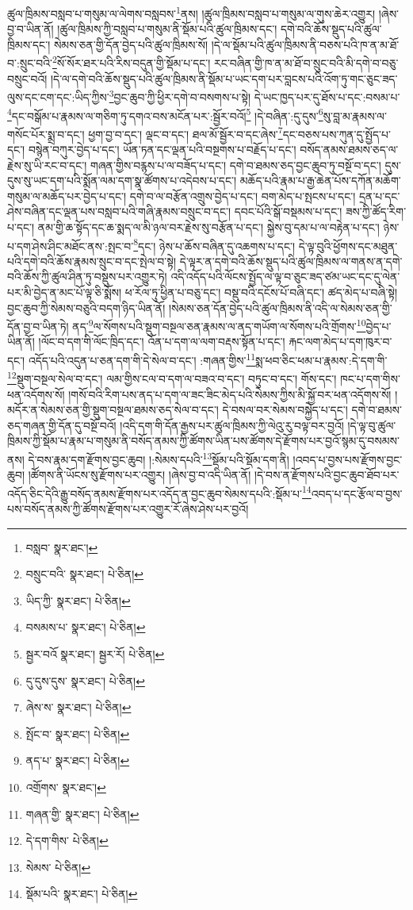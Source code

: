 ཚུལ་ཁྲིམས་བསླབ་པ་གསུམ་ལ་ལེགས་བསླབས་\footnote{བསླབ་  སྣར་ཐང་། }ནས། །ཚུལ་ཁྲིམས་བསླབ་པ་གསུམ་ལ་གུས་ཆེར་འགྱུར། །ཞེས་བྱ་བ་ཡིན་ནོ། །ཚུལ་ཁྲིམས་ཀྱི་བསླབ་པ་གསུམ་ནི་སྡོམ་པའི་ཚུལ་ཁྲིམས་དང་། དགེ་བའི་ཆོས་སྡུད་པའི་ཚུལ་ཁྲིམས་དང་། སེམས་ཅན་གྱི་དོན་བྱེད་པའི་ཚུལ་ཁྲིམས་སོ། །དེ་ལ་སྡོམ་པའི་ཚུལ་ཁྲིམས་ནི་བཅས་པའི་ཁ་ན་མ་ཐོ་བ་:སྲུང་བའི་\footnote{བསྲུང་བའི་  སྣར་ཐང་།  པེ་ཅིན། }སོ་སོར་ཐར་པའི་རིས་བདུན་གྱི་སྡོམ་པ་དང་། རང་བཞིན་གྱི་ཁ་ན་མ་ཐོ་བ་སྲུང་བའི་མི་དགེ་བ་བཅུ་བསྲུང་བའོ། །དེ་ལ་དགེ་བའི་ཆོས་སྡུད་པའི་ཚུལ་ཁྲིམས་ནི་སྡོམ་པ་ཡང་དག་པར་བླངས་པའི་འོག་ཏུ་གང་ཅུང་ཟད་ལུས་དང་ངག་དང་:ཡིད་ཀྱིས་\footnote{ཡིད་ཀྱི་  སྣར་ཐང་།  པེ་ཅིན། }བྱང་ཆུབ་ཀྱི་ཕྱིར་དགེ་བ་བསགས་པ་སྟེ། དེ་ཡང་ཁྱད་པར་དུ་ཐོས་པ་དང་:བསམ་པ་\footnote{བསམས་པ་  སྣར་ཐང་།  པེ་ཅིན། }དང་བསྒོམ་པ་རྣམས་ལ་གཅིག་ཏུ་དགའ་བས་མངོན་པར་:སྦྱོར་བའོ།\footnote{སྦྱར་བའོ  སྣར་ཐང་། སྦྱར་རོ།  པེ་ཅིན། } །དེ་བཞིན་:དུ་དུས་\footnote{དུ་དུས་དུས་  སྣར་ཐང་།  པེ་ཅིན། }སུ་བླ་མ་རྣམས་ལ་གསོང་པོར་སྨྲ་བ་དང་། ཕྱག་བྱ་བ་དང་། ལྡང་བ་དང་། ཐལ་མོ་སྦྱོར་བ་དང་ཞེས་\footnote{ཞེས་ས་  སྣར་ཐང་།  པེ་ཅིན། }དང་བཅས་པས་ཀུན་དུ་སྤྱོད་པ་དང་། བསྙེན་བཀུར་བྱེད་པ་དང་། ཡོན་ཏན་དང་ལྡན་པའི་བསྔགས་པ་བརྗོད་པ་དང་། བསོད་ནམས་ཐམས་ཅད་ལ་རྗེས་སུ་ཡི་རང་བ་དང་། གཞན་གྱིས་བརྙས་པ་ལ་བཟོད་པ་དང་། དགེ་བ་ཐམས་ཅད་བྱང་ཆུབ་ཏུ་བསྔོ་བ་དང་། དུས་དུས་སུ་ཡང་དག་པའི་སྨོན་ལམ་དག་སྣ་ཚོགས་པ་འདེབས་པ་དང་། མཆོད་པའི་རྣམ་པ་རྒྱ་ཆེན་པོས་དཀོན་མཆོག་གསུམ་ལ་མཆོད་པར་བྱེད་པ་དང་། དགེ་བ་ལ་བརྩོན་འགྲུས་བྱེད་པ་དང་། བག་མེད་པ་སྤངས་པ་དང་། དྲན་པ་དང་ཤེས་བཞིན་དང་ལྡན་པས་བསླབ་པའི་གཞི་རྣམས་བསྲུང་བ་དང་། དབང་པོའི་སྒོ་བསྡམས་པ་དང་། ཟས་ཀྱི་ཚོད་རིག་པ་དང་། ནམ་གྱི་ཆ་སྟོད་དང་ཆ་སྨད་ལ་མི་ཉལ་བར་རྗེས་སུ་བརྩོན་པ་དང་། སྐྱེས་བུ་དམ་པ་ལ་བརྟེན་པ་དང་། ཉེས་པ་དག་ཤེས་ཤིང་མཐོང་ནས་:སྤང་བ་\footnote{སྤོང་བ་  སྣར་ཐང་།  པེ་ཅིན། }དང་། ཉེས་པ་ཆོས་བཞིན་དུ་འཆགས་པ་དང་། དེ་ལྟ་བུའི་ཕྱོགས་དང་མཐུན་པའི་དགེ་བའི་ཆོས་རྣམས་སྲུང་བ་དང་སྤེལ་བ་སྟེ། དེ་ལྟར་ན་དགེ་བའི་ཆོས་སྡུད་པའི་ཚུལ་ཁྲིམས་ལ་གནས་ན་དགེ་བའི་ཆོས་ཀྱི་ཚུལ་ཤིན་ཏུ་བསྡུས་པར་འགྱུར་ཏེ། འདི་འདོད་པའི་ལོངས་སྤྱོད་ལ་ལྟ་བ་ཅུང་ཟད་ཙམ་ཡང་དང་དུ་ལེན་པར་མི་བྱེད་ན་མང་པོ་ལྟ་ཅི་སྨོས། ཕ་རོལ་ཏུ་ཕྱིན་པ་བཅུ་དང་། བསྡུ་བའི་དངོས་པོ་བཞི་དང་། ཚད་མེད་པ་བཞི་སྟེ། བྱང་ཆུབ་ཀྱི་སེམས་བཅུའི་བདག་ཉིད་ཡིན་ནོ། །སེམས་ཅན་དོན་བྱེད་པའི་ཚུལ་ཁྲིམས་ནི་འདི་ལ་སེམས་ཅན་གྱི་དོན་བྱ་བ་ཡིན་ཏེ། ནད་\footnote{ནད་པ་  སྣར་ཐང་།  པེ་ཅིན། }ལ་སོགས་པའི་སྡུག་བསྔལ་ཅན་རྣམས་ལ་ནད་གཡོག་ལ་སོགས་པའི་གྲོགས་\footnote{འགྲོགས་  སྣར་ཐང་། }བྱེད་པ་ཡིན་ནོ། །ལོང་བ་དག་གི་ལོང་ཁྲིད་དང་། འོན་པ་དག་ལ་ལག་བརྡས་སྟོན་པ་དང་། རྐང་ལག་མེད་པ་དག་ཁུར་བ་དང་། འདོད་པའི་འདུན་པ་ཅན་དག་གི་དེ་སེལ་བ་དང་། :གཞན་གྱིས་\footnote{གཞན་གྱི་  སྣར་ཐང་།  པེ་ཅིན། }སྨ་ཕབ་ཅིང་ཕམ་པ་རྣམས་:དེ་དག་གི་\footnote{དེ་དག་གིས་  པེ་ཅིན། }སྡུག་བསྔལ་སེལ་བ་དང་། ལམ་གྱིས་ངལ་བ་དག་ལ་བཟའ་བ་དང་། བཏུང་བ་དང་། གོས་དང་། ཁང་པ་དག་གིས་ཕན་འདོགས་སོ། །གསོ་བའི་རིག་པས་ནད་པ་དག་ལ་ཟང་ཟིང་མེད་པའི་སེམས་ཀྱིས་མི་སྐྱོ་བར་ཕན་འདོགས་སོ། །མདོར་ན་སེམས་ཅན་གྱི་སྡུག་བསྔལ་ཐམས་ཅད་སེལ་བ་དང་། དེ་བསལ་བར་སེམས་བསྐྱེད་པ་དང་། དགེ་བ་ཐམས་ཅད་གཞན་གྱི་དོན་དུ་བསྔོ་བའོ། །འདི་དག་གི་དོན་རྒྱས་པར་ཚུལ་ཁྲིམས་ཀྱི་ལེའུ་རུ་བལྟ་བར་བྱའོ། །དེ་ལྟ་བུ་ཚུལ་ཁྲིམས་ཀྱི་སྡོམ་པ་རྣམ་པ་གསུམ་ནི་བསོད་ནམས་ཀྱི་ཚོགས་ཡིན་པས་ཚོགས་དེ་རྫོགས་པར་བྱའོ་སྙམ་དུ་བསམས་ནས། དེ་བས་རྣམ་དག་རྫོགས་བྱང་ཆུབ། །:སེམས་དཔའི་\footnote{སེམས་  པེ་ཅིན། }སྡོམ་པའི་སྡོམ་དག་ནི། །འབད་པ་བྱས་པས་རྫོགས་བྱང་ཆུབ། །ཚོགས་ནི་ཡོངས་སུ་རྫོགས་པར་འགྱུར། །ཞེས་བྱ་བ་འདི་ཡིན་ནོ། །དེ་བས་ན་རྫོགས་པའི་བྱང་ཆུབ་ཐོབ་པར་འདོད་ཅིང་དེའི་རྒྱུ་བསོད་ནམས་རྫོགས་པར་འདོད་ན་བྱང་ཆུབ་སེམས་དཔའི་:སྡོམ་པ་\footnote{སྡོམ་པའི་  སྣར་ཐང་།  པེ་ཅིན། }འབད་པ་དང་རྩོལ་བ་བྱས་པས་བསོད་ནམས་ཀྱི་ཚོགས་རྫོགས་པར་འགྱུར་རོ་ཞེས་ཤེས་པར་བྱའོ། 